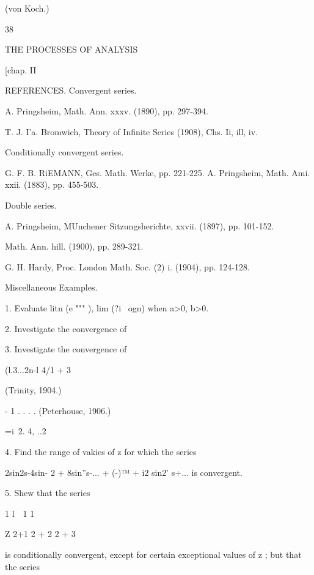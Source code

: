 (von Koch.) 



38 



THE PROCESSES OF ANALYSIS 



[chap. II 



REFERENCES. 
Convergent series. 

A. Pringsheim, Math. Ann. xxxv. (1890), pp. 297-394. 

T. J. I'a. Bromwich, Theory of Infinite Series (1908), Chs. Ii, ill, iv. 

Conditionally convergent series. 

G. F. B. RiEMANN, Ges. Math. Werke, pp. 221-225. 
A. Pringsheim, Math. Ami. xxii. (1883), pp. 455-503. 

Double series. 

A. Pringsheim, MUnchener Sitzungsherichte, xxvii. (1897), pp. 101-152. 

    Math. Ann. hill. (1900), pp. 289-321. 

G. H. Hardy, Proc. London Math. Soc. (2) i. (1904), pp. 124-128. 



Miscellaneous Examples. 

1. Evaluate litn (e """ ), lim (?i~   ogn) when a>0, b>0. 



2. Investigate the convergence of 






3. Investigate the convergence of 

(l.3...2n-l 4/1 + 3 



(Trinity, 1904.) 



- 1   .   .   . . (Peterhouse, 1906.) 

 =i\ 2. 4, ..2%

4. Find the range of vakies of z for which the series 

2sin2s-4sin- 2 + 8sin''s-... + (-)™ + i2 sin2' s+... 
is convergent. 

5. Shew that the series 

1 l\  \ 1 1\  

Z 2+1 2 + 2 2 + 3 

is conditionally convergent, except for certain exceptional values of z ; but that the series 

